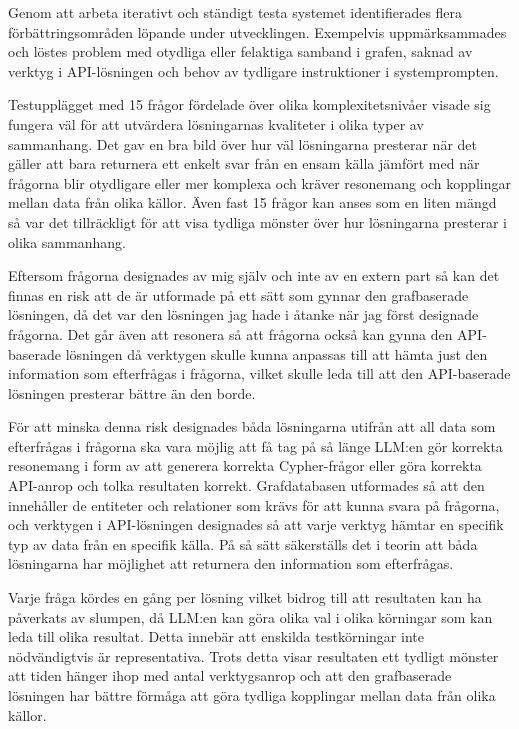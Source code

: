 Genom att arbeta iterativt och ständigt testa systemet identifierades flera förbättringsområden löpande under utvecklingen.
Exempelvis uppmärksammades och löstes problem med otydliga eller felaktiga samband i grafen, saknad av verktyg i API-lösningen och behov av tydligare instruktioner i systemprompten.

Testupplägget med 15 frågor fördelade över olika komplexitetsnivåer visade sig fungera väl för att utvärdera lösningarnas kvaliteter i olika typer av sammanhang.
Det gav en bra bild över hur väl lösningarna presterar när det gäller att bara returnera ett enkelt svar från en ensam källa jämfört med när frågorna blir otydligare eller mer komplexa och kräver resonemang och kopplingar mellan data från olika källor.
Även fast 15 frågor kan anses som en liten mängd så var det tillräckligt för att visa tydliga mönster över hur lösningarna presterar i olika sammanhang. 

Eftersom frågorna designades av mig själv och inte av en extern part så kan det finnas en risk att de är utformade på ett sätt som gynnar den grafbaserade lösningen, då det var den lösningen jag hade i åtanke när jag först designade frågorna.
Det går även att resonera så att frågorna också kan gynna den API-baserade lösningen då verktygen skulle kunna anpassas till att hämta just den information som efterfrågas i frågorna, vilket skulle leda till att den API-baserade lösningen presterar bättre än den borde.

För att minska denna risk designades båda lösningarna utifrån att all data som efterfrågas i frågorna ska vara möjlig att få tag på så länge LLM:en gör korrekta resonemang i form av att generera korrekta Cypher-frågor eller göra korrekta API-anrop och tolka resultaten korrekt.
Grafdatabasen utformades så att den innehåller de entiteter och relationer som krävs för att kunna svara på frågorna, och verktygen i API-lösningen designades så att varje verktyg hämtar en specifik typ av data från en specifik källa.
På så sätt säkerställs det i teorin att båda lösningarna har möjlighet att returnera den information som efterfrågas.

Varje fråga kördes en gång per lösning vilket bidrog till att resultaten kan ha påverkats av slumpen, då LLM:en kan göra olika val i olika körningar som kan leda till olika resultat.
Detta innebär att enskilda testkörningar inte nödvändigtvis är representativa. Trots detta visar resultaten ett tydligt mönster att tiden hänger ihop med antal verktygsanrop och att den grafbaserade lösningen har bättre förmåga att göra tydliga kopplingar mellan data från olika källor.

